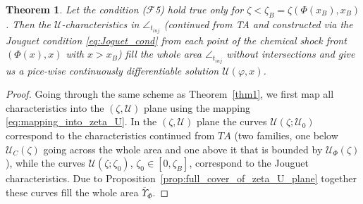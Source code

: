 \documentclass[12pt]{article}
\newtheorem{theorem}{Theorem}
\theoremstyle{definition}
\begin{document}
\begin{theorem}
Let the condition ($\mathcal F$5) hold true only for $\zeta < \zeta_B = \zeta(\Phi(x_B), x_B)$. Then the $\mathcal U$-characteristics in $\angle_{t_{inj}}$ (continued from TA and constructed via the Jouguet condition \eqref{eq:Joguet_cond} from each point of the chemical shock front $(\Phi(x),x)$ with $x>x_B$) fill the whole area $\angle_{t_{inj}}$ without intersections and give us a pice-wise continuously differentiable solution $\mathcal U(\varphi, x)$.
\end{theorem}

\begin{proof}
Going through the same scheme as Theorem~\ref{thm1},
we first map all characteristics into the $(\zeta, \mathcal U)$ plane using the mapping \eqref{eq:mapping_into_zeta_U}. In the $(\zeta, \mathcal U)$ plane the curves $\mathcal U(\zeta; \mathcal U_0)$ correspond to the characteristics continued from $TA$ (two families, one below $\mathcal U_C(\zeta)$ going across the whole area and one above it that is bounded by $\mathcal U_\Phi(\zeta)$), while the curves $\mathcal U(\zeta; \zeta_0)$, $\zeta_0\in[0,\zeta_B]$, correspond to the Jouguet characteristics.
Due to Proposition~\ref{prop:full_cover_of_zeta_U_plane} together these curves fill the whole area $\overline{\Upsilon}_\Phi$.


\end{proof}
\end{document}
